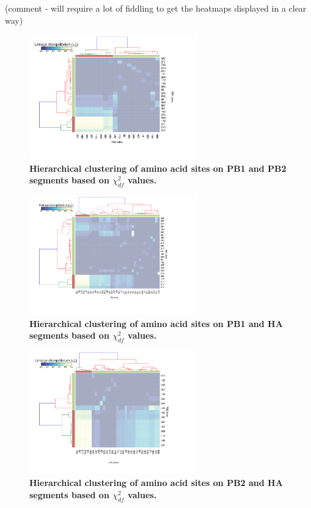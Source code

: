 \documentclass[11pt,oneside,letterpaper]{article}
\begin{document}
(comment - will require a lot of fiddling to get the heatmaps displayed in a clear way)
\begin{figure}[h]
	\centering	
	\includegraphics[width=0.65\textwidth]	{figures/Chi_PB1_PB2.png}
	\caption{\textbf{Hierarchical clustering of amino acid sites on PB1 and PB2 segments based on $\chi^{2}_{df}$ values.}}
	\label{ChiPB1PB2}
\end{figure}

\begin{figure}[h]
	\centering	
	\includegraphics[width=0.65\textwidth]	{figures/Chi_PB1_HA.png}
	\caption{\textbf{Hierarchical clustering of amino acid sites on PB1 and HA segments based on $\chi^{2}_{df}$ values.}}
	\label{ChiPB1HA}
\end{figure}

\begin{figure}[h]
	\centering	
	\includegraphics[width=0.65\textwidth]	{figures/Chi_PB2_HA.png}
	\caption{\textbf{Hierarchical clustering of amino acid sites on PB2 and HA segments based on $\chi^{2}_{df}$ values.}}
	\label{ChiPB2HA}
\end{figure}
\end{document}
